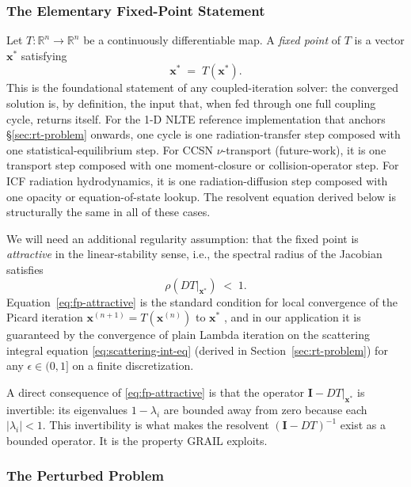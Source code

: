 \documentclass[11pt]{article}
\begin{document}
\subsubsection{The Elementary Fixed-Point Statement}

Let $T : \mathbb{R}^n \to \mathbb{R}^n$ be a continuously differentiable
map.  A \emph{fixed point} of $T$ is a vector $\mathbf{x}^*$ satisfying
\begin{equation}
\mathbf{x}^* \;=\; T(\mathbf{x}^*) .
\label{eq:fp-elementary}
\end{equation}
This is the foundational statement of any coupled-iteration solver: the
converged solution is, by definition, the input that, when fed through
one full coupling cycle, returns itself.  For the 1-D NLTE reference
implementation that anchors \S\ref{sec:rt-problem} onwards, one cycle
is one radiation-transfer step composed with one
statistical-equilibrium step.  For CCSN $\nu$-transport (future-work), it
is one transport step composed with one moment-closure or
collision-operator step.  For ICF radiation hydrodynamics, it is one
radiation-diffusion step composed with one opacity or
equation-of-state lookup.  The resolvent equation derived below is
structurally the same in all of these cases.

We will need an additional regularity assumption: that the fixed point is
\emph{attractive} in the linear-stability sense, i.e., the spectral radius
of the Jacobian satisfies
\begin{equation}
\rho\!\left(DT\big|_{\mathbf{x}^*}\right) \;<\; 1.
\label{eq:fp-attractive}
\end{equation}
Equation~\eqref{eq:fp-attractive} is the standard condition for local
convergence of the Picard iteration $\mathbf{x}^{(n+1)} = T(\mathbf{x}^{(n)})$
to $\mathbf{x}^*$ \citep[e.g., HM14 \S13.4]{HubenyMihalas2014}, and in our
application it is guaranteed by the convergence of plain Lambda iteration
on the scattering integral equation \eqref{eq:scattering-int-eq} (derived
in Section~\ref{sec:rt-problem}) for any $\epsilon \in (0, 1]$ on a finite
discretization.

A direct consequence of \eqref{eq:fp-attractive} is that the operator
$\mathbf{I} - DT|_{\mathbf{x}^*}$ is invertible: its eigenvalues
$1 - \lambda_i$ are bounded away from zero because each
$|\lambda_i| < 1$.  This invertibility is what makes the resolvent
$(\mathbf{I} - DT)^{-1}$ exist as a bounded operator.  It is the
property GRAIL exploits.

\subsubsection{The Perturbed Problem}
\end{document}
